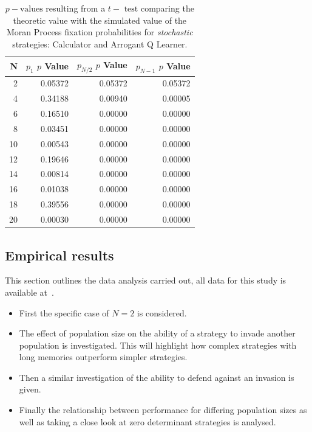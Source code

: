 \documentclass[10pt,letterpaper]{article}
\begin{document}
\begin{table}[!hbtp]
    \centering
        \begin{tabular}{rrrr}
        \toprule
          N &  $p_1$ $p$ Value &  $p_{N / 2}$ $p$ Value &  $p_{N - 1}$ $p$ Value \\
        \midrule
          2 &          0.05372 &                0.05372 &                0.05372 \\
          4 &          0.34188 &                0.00940 &                0.00005 \\
          6 &          0.16510 &                0.00000 &                0.00000 \\
          8 &          0.03451 &                0.00000 &                0.00000 \\
         10 &          0.00543 &                0.00000 &                0.00000 \\
         12 &          0.19646 &                0.00000 &                0.00000 \\
         14 &          0.00814 &                0.00000 &                0.00000 \\
         16 &          0.01038 &                0.00000 &                0.00000 \\
         18 &          0.39556 &                0.00000 &                0.00000 \\
         20 &          0.00030 &                0.00000 &                0.00000 \\
        \bottomrule
        \end{tabular}
    \caption{\(p-\text{values}\) resulting from a \(t-\text{ test}\) comparing the theoretic
        value with the simulated value of the Moran Process fixation
        probabilities for \textit{stochastic} strategies: Calculator and
    Arrogant Q Learner.}
    \label{tab:comparison_stochastic}
\end{table}

\subsection*{Empirical results}

This section outlines the data analysis carried out, all data for this study is
available at~\cite{data}.

\begin{itemize}
    \item First the specific case of
        \(N=2\) is considered.
    \item The effect of
        population size on the ability of a strategy to invade another
        population is investigated. This will highlight how complex strategies with long
        memories outperform simpler strategies.
    \item Then a similar investigation of the
        ability to defend against an invasion is given.
    \item Finally the relationship
        between performance for differing population sizes as well as
        taking a close look at zero determinant strategies \cite{Press2012} is
        analysed.
\end{itemize}
\end{document}
